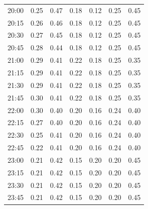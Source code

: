 \begin{longtable}{@{}lrrrrrr@{}}
20:00 & 0.25 & 0.47 & 0.18 & 0.12 & 0.25 & 0.45 \\
20:15 & 0.26 & 0.46 & 0.18 & 0.12 & 0.25 & 0.45 \\
20:30 & 0.27 & 0.45 & 0.18 & 0.12 & 0.25 & 0.45 \\
20:45 & 0.28 & 0.44 & 0.18 & 0.12 & 0.25 & 0.45 \\
21:00 & 0.29 & 0.41 & 0.22 & 0.18 & 0.25 & 0.35 \\
21:15 & 0.29 & 0.41 & 0.22 & 0.18 & 0.25 & 0.35 \\
21:30 & 0.29 & 0.41 & 0.22 & 0.18 & 0.25 & 0.35 \\
21:45 & 0.30 & 0.41 & 0.22 & 0.18 & 0.25 & 0.35 \\
22:00 & 0.30 & 0.40 & 0.20 & 0.16 & 0.24 & 0.40 \\
22:15 & 0.27 & 0.40 & 0.20 & 0.16 & 0.24 & 0.40 \\
22:30 & 0.25 & 0.41 & 0.20 & 0.16 & 0.24 & 0.40 \\
22:45 & 0.22 & 0.41 & 0.20 & 0.16 & 0.24 & 0.40 \\
23:00 & 0.21 & 0.42 & 0.15 & 0.20 & 0.20 & 0.45 \\
23:15 & 0.21 & 0.42 & 0.15 & 0.20 & 0.20 & 0.45 \\
23:30 & 0.21 & 0.42 & 0.15 & 0.20 & 0.20 & 0.45 \\
23:45 & 0.21 & 0.42 & 0.15 & 0.20 & 0.20 & 0.45 \\
\bottomrule\end{longtable}
